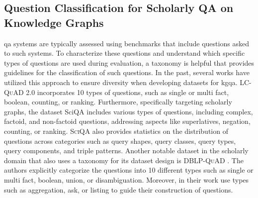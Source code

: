 

\subsection{Question Classification for Scholarly QA on Knowledge Graphs}
\label{sec:related_work_kgqa_classifiation}

\gls{qa} systems are typically assessed using benchmarks that include questions asked to such systems. To characterize these questions and understand which specific types of questions are used during evaluation, a taxonomy is helpful that provides guidelines for the classification of such questions. In the past, several works have utilized this approach to ensure diversity when developing datasets for \gls{kgqa}. \textsc{LC-QuAD 2.0} \cite{dubey_lc-quad_2019} incorporates 10 types of questions, such as single or multi fact, boolean, counting, or ranking. Furthermore, specifically targeting scholarly graphs, the dataset SciQA \cite{auer_sciqa_2023} includes various types of questions, including complex, factoid, and non-factoid questions, addressing aspects like superlatives, negation, counting, or ranking. \textsc{SciQA} also provides statistics on the distribution of questions across categories such as query shapes, query classes, query types, query components, and triple patterns. Another notable dataset in the scholarly domain that also uses a taxonomy for its dataset design is \textsc{DBLP-QuAD} \cite{banerjee_dblp-quad_2023}. The authors explicitly categorize the questions into 10 different types such as single or multi fact, boolean, union, or disambiguation. Moreover, \textcite{jaradeh_question_2020} in their work use types such as aggregation, ask, or listing to guide their construction of questions.

